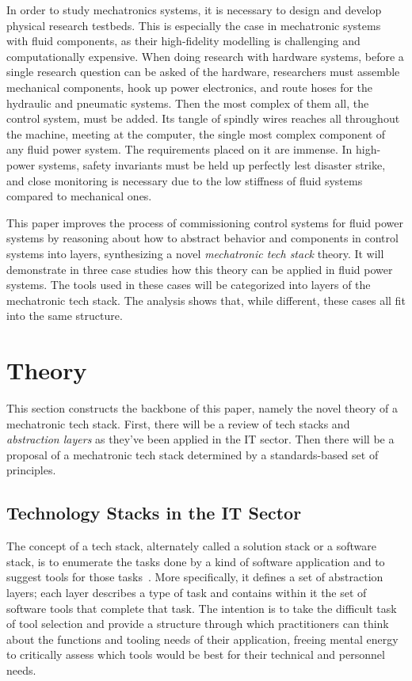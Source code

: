 \documentclass[english,12pt,a4paper,pdftex,eng,utf8]{aaltothesis}
\begin{document}
\thispagestyle{empty}

In order to study mechatronics systems, it is necessary to design and develop physical research testbeds. This is especially the case in mechatronic systems with fluid components, as their high-fidelity modelling is challenging and computationally expensive. When doing research with hardware systems, before a single research question can be asked of the hardware, researchers must assemble mechanical components, hook up power electronics, and route hoses for the hydraulic and pneumatic systems. Then the most complex of them all, the control system, must be added. Its tangle of spindly wires reaches all throughout the machine, meeting at the computer, the single most complex component of any fluid power system. The requirements placed on it are immense. In high-power systems, safety invariants must be held up perfectly lest disaster strike, and close monitoring is necessary due to the low stiffness of fluid systems compared to mechanical ones.

This paper improves the process of commissioning control systems for fluid power systems by reasoning about how to abstract behavior and components in control systems into layers, synthesizing a novel {\it mechatronic tech stack\/} theory. It will demonstrate in three case studies how this theory can be applied in fluid power systems. The tools used in these cases will be categorized into layers of the mechatronic tech stack.  The analysis shows that, while different, these cases all fit into the same structure.

\clearpage


\section{Theory}

This section constructs the backbone of this paper, namely the novel theory of a mechatronic tech stack. First, there will be a review of tech stacks and {\it abstraction layers\/} as they've been applied in the IT sector. Then there will be a proposal of a mechatronic tech stack determined by a standards-based set of principles.

\subsection{Technology Stacks in the IT Sector}

The concept of a tech stack, alternately called a solution stack or a software stack, is to enumerate the tasks done by a kind of software application and to suggest tools for those tasks~\cite{PranamStack2017}. More specifically, it defines a set of abstraction layers; each layer describes a type of task and contains within it the set of software tools that complete that task. The intention is to take the difficult task of tool selection and provide a structure through which practitioners can think about the functions and tooling needs of their application, freeing mental energy to critically assess which tools would be best for their technical and personnel needs.
\end{document}

